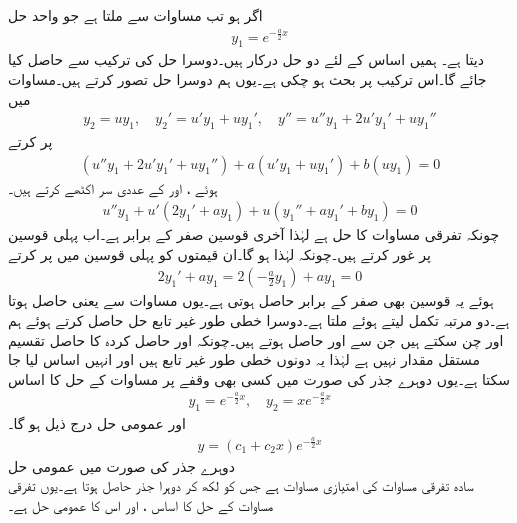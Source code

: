 اگر  ہو تب مساوات  سے  ملتا ہے جو واحد حل
\begin{align*}
y_1=e^{-\frac{a}{2}x}
\end{align*}
دیتا ہے۔ ہمیں اساس کے لئے دو حل درکار ہیں۔دوسرا حل  کی ترکیب سے حاصل کیا جائے گا۔اس ترکیب پر بحث ہو چکی ہے۔یوں ہم دوسرا حل  تصور کرتے ہیں۔مساوات  میں
\begin{align*}
y_2=uy_1,\quad y_2'=u'y_1+uy_1',\quad y''=u''y_1+2u'y_1'+uy_1''
\end{align*}
پر کرتے
\begin{align*}
(u''y_1+2u'y_1'+uy_1'')+a(u'y_1+uy_1')+b(uy_1)=0
\end{align*}
ہوئے ،  اور  کے عددی سر اکٹھے کرتے ہیں۔
\begin{align}\label{مساوات_سادہ_دو_درجی_دوہرا_جذر_الف}
u'' y_1+u'(2y_1'+ay_1)+u(y_1''+ay_1'+by_1)=0
\end{align}
چونکہ  تفرقی مساوات کا حل ہے لہٰذا آخری قوسین صفر کے برابر  ہے۔اب پہلی قوسین پر غور کرتے ہیں۔چونکہ  لہٰذا  ہو گا۔ان قیمتوں کو پہلی قوسین میں پر کرتے
\begin{align*}
2y_1'+ay_1=2(-\frac{a}{2}y_1)+ay_1=0
\end{align*}
ہوئے یہ قوسین بھی صفر کے برابر حاصل ہوتی ہے۔یوں مساوات  سے  یعنی  حاصل ہوتا ہے۔دو مرتبہ تکمل لیتے ہوئے  ملتا ہے۔دوسرا خطی طور غیر تابع حل  حاصل کرتے ہوئے ہم  اور  چن سکتے ہیں جن سے
  اور  حاصل ہوتے ہیں۔چونکہ  اور حاصل کردہ  کا حاصل تقسیم مستقل مقدار نہیں ہے لہٰذا یہ دونوں خطی طور غیر تابع ہیں اور انہیں اساس لیا جا سکتا ہے۔یوں دوہرے جذر کی صورت میں کسی بھی وقفے پر مساوات  کے حل کا اساس 
\begin{align*}
y_1=e^{-\frac{a}{2}x}, \quad y_2=xe^{-\frac{a}{2}x}
\end{align*}
اور عمومی حل درج ذیل ہو گا۔
\begin{align}
y=(c_1 +c_2 x)e^{-\frac{a}{2}x}
\end{align}
\quad دوہرے جذر کی صورت میں عمومی حل\\
سادہ تفرقی مساوات  کی امتیازی مساوات  ہے جس کو  لکھ کر دوہرا جذر  حاصل ہوتا ہے۔یوں تفرقی مساوات کے حل کا اساس ،  اور اس کا عمومی حل  ہے۔

